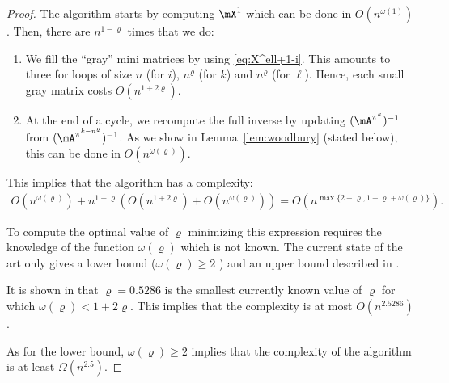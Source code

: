 \begin{proof}
    The algorithm starts by computing $\mX^1$ which can be done in $O( n^{\omega(1)})$. Then, there are $ n^{1-\varrho} $ times that we do:
    \begin{enumerate}
        \item We fill the ``gray'' mini matrices by using \eqref{eq:X^ell+1-i}. This amounts to three for loops of size $n$ (for $i$), $ n^\varrho $ (for $k$) and $ n^\varrho $ (for $\ell$). Hence, each small gray matrix costs $O( n^{1+2\varrho} )$.
        \item At the end of a cycle, we recompute the full inverse by updating $(\mA^{\pi^k})^{-1}$ from $(\mA^{\pi^{k- n^\varrho }})^{-1}$. As we show in Lemma~\ref{lem:woodbury} (stated below), this can be done in $O( n^{\omega(\varrho)} )$.
    \end{enumerate}
This implies that the algorithm has a complexity:
    \begin{align*}
        O( n^{\omega(\varrho)} ) +  n^{1-\varrho}  \left(O( n^{1+2\varrho} )+O( n^{\omega(\varrho)} )\right)  = O( n^{\max\{2+\varrho, 1-\varrho + \omega(\varrho)\}} ).
    \end{align*}
    
    To compute the optimal value of $\varrho$ minimizing this expression requires the knowledge of the function 
    $\omega(\varrho)$ which is  not known. The current state of the art  only gives  a lower bound ($\omega(\varrho) \geq 2$ ) and an upper bound described in  \cite{gall2018improved}.
    
    It is shown in \cite{gall2018improved} that $\varrho=0.5286$ is the smallest currently known value of $\varrho$ for which  $\omega(\varrho)<1+2\varrho$. This implies that the complexity is  at most $O(n^{2.5286})$.
    
    As for the lower bound,  $\omega(\varrho) \geq 2$ implies that the complexity of the
    algorithm is at least  $\Omega(n^{2.5})$.
\end{proof}
  

